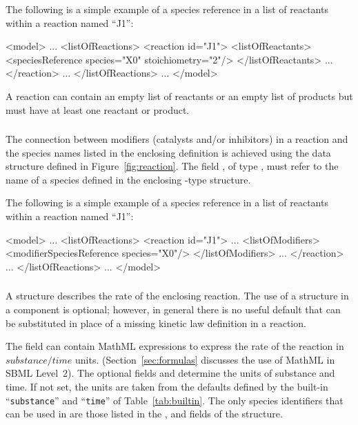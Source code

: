 \documentclass[10pt,twocolumntoc]{cekarticle}
\newcommand{\vref}[1]{\ref{#1}}
\begin{document}
The following is a simple example of a species reference in a list
of reactants within a reaction named ``J1'':
\begin{example}
<model>
    ...
    <listOfReactions>
        <reaction id="J1">
            <listOfReactants>
                <speciesReference species="X0" stoichiometry="2"/>
            </listOfReactants>
            ...
        </reaction>
        ...
    </listOfReactions>
    ...
</model>
\end{example}

A reaction can contain an empty list of reactants or an empty list
of products but must have at least one reactant or product.

\subsubsection{}
\label{subsec:modifierreference}

The connection between modifiers (catalysts and/or inhibitors) in a
reaction and the species names listed in the enclosing 
definition is achieved using the  data
structure defined in Figure~\vref{fig:reaction}.  The field
, of type , must refer to the name of a species
defined in the enclosing -type structure.

The following is a simple example of a species reference in a list
of reactants within a reaction named ``J1'':
\begin{example}
<model>
    ...
    <listOfReactions>
        <reaction id="J1">
            ...
            <listOfModifiers>
                <modifierSpeciesReference species="X0"/>
            </listOfModifiers>
            ...
        </reaction>
        ...
    </listOfReactions>
    ...
</model>
\end{example}

\subsubsection{}
\label{subsec:kinetic-law}

A  structure describes the rate of the enclosing
reaction.  The use of a  structure in a 
component is optional; however, in general there is no useful default that
can be substituted in place of a missing kinetic law definition in a
reaction.

The field  can contain MathML expressions to express the rate
of the reaction in $substance/time$ units.  (Section~\ref{sec:formulas}
discusses the use of MathML in SBML Level~2).  The optional fields
 and  determine the units of
substance and time.  If not set, the units are taken from the defaults
defined by the built-in ``\texttt{substance}'' and ``\texttt{time}'' of
Table~\vref{tab:builtin}.  The only species identifiers that can be used in
 are those listed in the ,  and
 fields of the  structure.
\end{document}
